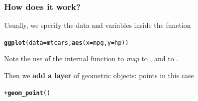 \documentclass[12pt]{beamer}\usepackage[]{graphicx}\usepackage[]{color}
\makeatletter
\newcommand{\hlopt}[1]{\textcolor[rgb]{0,0,0}{#1}}%
\newcommand{\hlstd}[1]{\textcolor[rgb]{0.345,0.345,0.345}{#1}}%
\newcommand{\hlkwc}[1]{\textcolor[rgb]{0.333,0.667,0.333}{#1}}%
\newcommand{\hlkwd}[1]{\textcolor[rgb]{0.737,0.353,0.396}{\textbf{#1}}}%
\newenvironment{kframe}{%
 \def\at@end@of@kframe{}%
 \ifinner\ifhmode%
  \def\at@end@of@kframe{\end{minipage}}%
  \begin{minipage}{\columnwidth}%
 \fi\fi%
 \def\FrameCommand##1{\hskip\@totalleftmargin \hskip-\fboxsep
 \colorbox{shadecolor}{##1}\hskip-\fboxsep
     \hskip-\linewidth \hskip-\@totalleftmargin \hskip\columnwidth}%
 \MakeFramed {\advance\hsize-\width
   \@totalleftmargin\z@ \linewidth\hsize
   \@setminipage}}%
 {\par\unskip\endMakeFramed%
 \at@end@of@kframe}
\newenvironment{knitrout}{}{} %
\makeatother
\begin{document}
\begin{frame}[fragile]
\frametitle{How does it work?}
Usually, we specify the data and variables inside the function {\hilit {}} 
\begin{knitrout}\footnotesize
{}\color{fgcolor}\begin{kframe}
\begin{alltt}
\hlkwd{ggplot}\hlstd{(}\hlkwc{data} \hlstd{= mtcars,} \hlkwd{aes}\hlstd{(}\hlkwc{x} \hlstd{= mpg,} \hlkwc{y} \hlstd{= hp))}
\end{alltt}
\end{kframe}
\end{knitrout}
Note the use of the internal function {\hilit {}} to \textit{map}  to , and  to .

\bigskip
Then we \textbf{add a layer} of geometric objects: points in this case
\begin{knitrout}\footnotesize
{}\color{fgcolor}\begin{kframe}
\begin{alltt}
\hlopt{+} \hlkwd{geom_point}\hlstd{()}
\end{alltt}
\end{kframe}
\end{knitrout}
\end{frame}

\end{document}
